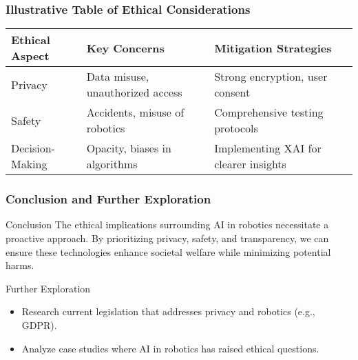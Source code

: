 \documentclass[aspectratio=169]{beamer}
\begin{document}
\begin{frame}[fragile]
    \frametitle{Illustrative Table of Ethical Considerations}
    \begin{table}[h]
        \centering
        \begin{tabular}{|l|l|l|}
            \hline
            \textbf{Ethical Aspect} & \textbf{Key Concerns} & \textbf{Mitigation Strategies} \\ \hline
            Privacy & Data misuse, unauthorized access & Strong encryption, user consent \\ \hline
            Safety & Accidents, misuse of robotics & Comprehensive testing protocols \\ \hline
            Decision-Making & Opacity, biases in algorithms & Implementing XAI for clearer insights \\ \hline
        \end{tabular}
    \end{table}
\end{frame}

\begin{frame}[fragile]
    \frametitle{Conclusion and Further Exploration}
    \begin{block}{Conclusion}
        The ethical implications surrounding AI in robotics necessitate a proactive approach. 
        By prioritizing privacy, safety, and transparency, we can ensure these technologies enhance societal welfare while minimizing potential harms.
    \end{block}
    \begin{block}{Further Exploration}
        \begin{itemize}
            \item Research current legislation that addresses privacy and robotics (e.g., GDPR).
            \item Analyze case studies where AI in robotics has raised ethical questions.
        \end{itemize}
    \end{block}
\end{frame}
\end{document}
